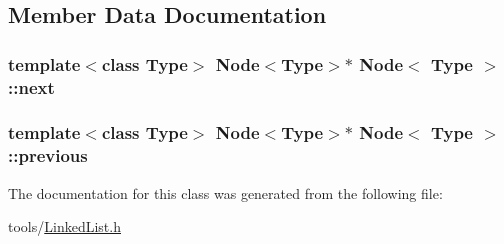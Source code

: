 \subsection{Member Data Documentation}
\hypertarget{classNode_ac3eee180a74bd4af7fbcf7d071bfae4f}{
\subsubsection[{next}]{\setlength{\rightskip}{0pt plus 5cm}template$<$class Type$>$ {\bf Node}$<$Type$>$$\ast$ {\bf Node}$<$ Type $>$\-::next}}\label{classNode_ac3eee180a74bd4af7fbcf7d071bfae4f}
\hypertarget{classNode_a3b482296542a8c0106ca107d189648e7}{
\subsubsection[{previous}]{\setlength{\rightskip}{0pt plus 5cm}template$<$class Type$>$ {\bf Node}$<$Type$>$$\ast$ {\bf Node}$<$ Type $>$\-::previous}}\label{classNode_a3b482296542a8c0106ca107d189648e7}


The documentation for this class was generated from the following file\-:\begin{DoxyCompactItemize}
\item 
tools/\hyperlink{LinkedList_8h}{Linked\-List.\-h}\end{DoxyCompactItemize}
